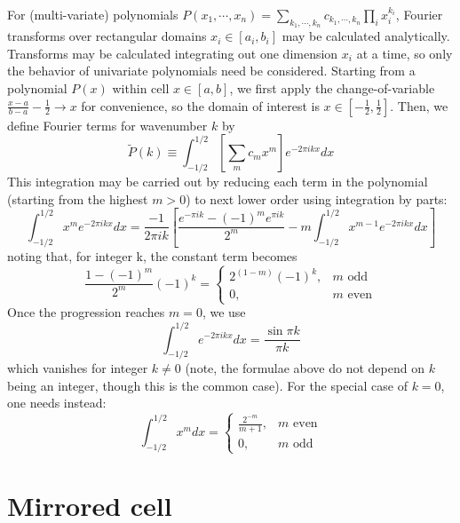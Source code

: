 \documentclass[11pt,english]{article}
\begin{document}
For (multi-variate) polynomials $P(x_1,\cdots,x_n) = \sum_{k_1,\cdots,k_n} c_{k_1,\cdots,k_n} \prod_i x_i^{k_i}$,
	Fourier transforms over rectangular domains $x_i \in [a_i,b_i]$ may be calculated analytically.
Transforms may be calculated integrating out one dimension $x_i$ at a time,
	so only the behavior of univariate polynomials need be considered.
Starting from a polynomial $P(x)$ within cell $x \in [a,b]$,
	we first apply the change-of-variable $\frac{x-a}{b-a} -\frac{1}{2} \rightarrow x$
	for convenience, so the domain of interest is $x \in \left[ -\frac{1}{2}, \frac{1}{2} \right]$.
Then, we define Fourier terms for wavenumber $k$ by
\begin{equation}
	\tilde P(k) \equiv \int_{-1/2}^{1/2} \left[ \sum_m c_m x^m \right] e^{-2\pi i k x} dx
\end{equation}
This integration may be carried out by reducing each term in the polynomial
	(starting from the highest $m > 0$) to next lower order using integration by parts:
\begin{equation}
	\int_{-1/2}^{1/2} x^m e^{-2 \pi i k x} dx
		= \frac{-1}{2\pi i k} \left[ \frac{e^{-\pi i k}-(-1)^m e^{\pi i k}}{2^m} -  m \int_{-1/2}^{1/2} x^{m-1} e^{-2\pi i k x} dx \right]
	\label{eq:ft_xn}
\end{equation}
noting that, for integer k, the constant term becomes
\begin{equation}
	\frac{1-(-1)^m}{2^m} (-1)^k =
	\begin{cases}
		2^{(1-m)} (-1)^k,	& \textrm{$m$ odd}		\\
		0,					& \textrm{$m$ even}
	\end{cases}
\end{equation}
Once the progression reaches $m=0$, we use
\begin{equation}
	\int_{-1/2}^{1/2} e^{-2\pi i k x} dx = \frac{\sin \pi k}{\pi k} 
\end{equation}
which vanishes for integer $k \neq 0$ (note, the formulae above do not depend on $k$ being an integer, though this is the common case).
For the special case of $k=0$, one needs instead:
\begin{equation}
	\int_{-1/2}^{1/2} x^m dx =
	\begin{cases}
		\frac{2^{-m}}{m+1},		& \textrm{$m$ even}		\\
		0,						& \textrm{$m$ odd}
	\end{cases}
\end{equation}

\section{Mirrored cell}
\end{document}
